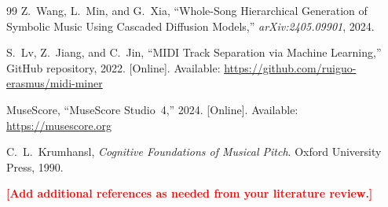 \documentclass[conference]{IEEEtran}
\newcommand{\placeholder}[1]{\textcolor{red}{\textbf{[#1]}}}
\begin{document}
\begin{thebibliography}{99}
Z.~Wang, L.~Min, and G.~Xia, ``Whole-Song Hierarchical Generation of Symbolic Music Using Cascaded Diffusion Models,'' \emph{arXiv:2405.09901}, 2024.

S.~Lv, Z.~Jiang, and C.~Jin, ``MIDI Track Separation via Machine Learning,''
GitHub repository, 2022. [Online]. Available:
\url{https://github.com/ruiguo-erasmus/midi-miner}

MuseScore, ``MuseScore Studio~4,'' 2024. [Online]. Available:
\url{https://musescore.org}

C.~L.~Krumhansl, \emph{Cognitive Foundations of Musical Pitch}.
Oxford University Press, 1990.

\placeholder{Add additional references as needed from your literature review.}

\end{thebibliography}
\end{document}
